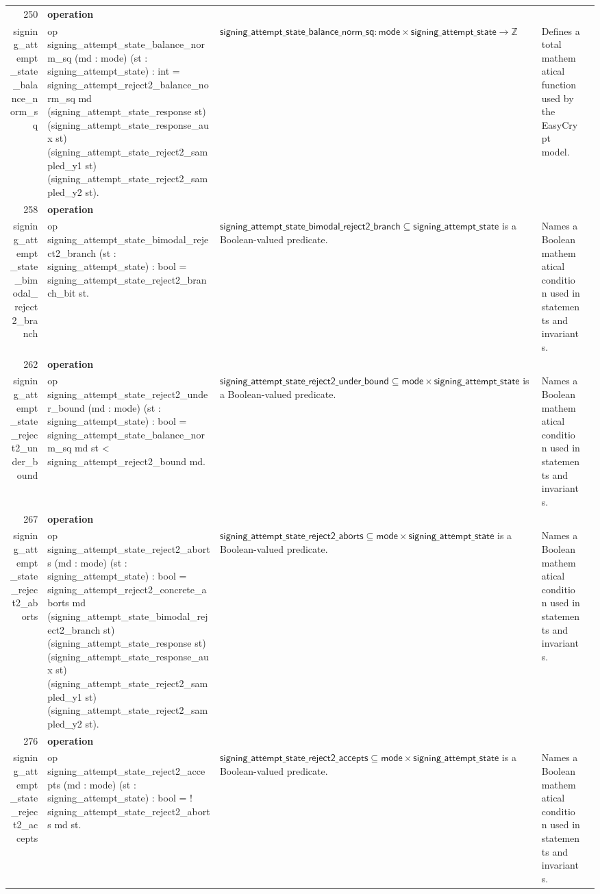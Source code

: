 \documentclass[10pt]{article}
\newcommand{\ec}[1]{\begingroup\ttfamily\scriptsize #1\endgroup}
\begin{document}
\begin{longtable}{r L{0.17\textwidth} L{0.26\textwidth} L{0.27\textwidth} L{0.20\textwidth}}
250 & \textbf{operation}\\\ec{signing\_attempt\_state\_balance\_norm\_sq} & \ec{op signing\_attempt\_state\_balance\_norm\_sq (md : mode) (st : signing\_attempt\_state) : int = signing\_attempt\_reject2\_balance\_norm\_sq md (signing\_attempt\_state\_response st) (signing\_attempt\_state\_response\_aux st) (signing\_attempt\_state\_reject2\_sampled\_y1 st) (signing\_attempt\_state\_reject2\_sampled\_y2 st).} & \(\mathsf{signing\_attempt\_state\_balance\_norm\_sq} : \mathsf{mode} \times \mathsf{signing\_attempt\_state} \to \mathbb{Z}\) & Defines a total mathematical function used by the EasyCrypt model. \\
258 & \textbf{operation}\\\ec{signing\_attempt\_state\_bimodal\_reject2\_branch} & \ec{op signing\_attempt\_state\_bimodal\_reject2\_branch (st : signing\_attempt\_state) : bool = signing\_attempt\_state\_reject2\_branch\_bit st.} & \(\mathsf{signing\_attempt\_state\_bimodal\_reject2\_branch} \subseteq \mathsf{signing\_attempt\_state}\) is a Boolean-valued predicate. & Names a Boolean mathematical condition used in statements and invariants. \\
262 & \textbf{operation}\\\ec{signing\_attempt\_state\_reject2\_under\_bound} & \ec{op signing\_attempt\_state\_reject2\_under\_bound (md : mode) (st : signing\_attempt\_state) : bool = signing\_attempt\_state\_balance\_norm\_sq md st < signing\_attempt\_reject2\_bound md.} & \(\mathsf{signing\_attempt\_state\_reject2\_under\_bound} \subseteq \mathsf{mode} \times \mathsf{signing\_attempt\_state}\) is a Boolean-valued predicate. & Names a Boolean mathematical condition used in statements and invariants. \\
267 & \textbf{operation}\\\ec{signing\_attempt\_state\_reject2\_aborts} & \ec{op signing\_attempt\_state\_reject2\_aborts (md : mode) (st : signing\_attempt\_state) : bool = signing\_attempt\_reject2\_concrete\_aborts md (signing\_attempt\_state\_bimodal\_reject2\_branch st) (signing\_attempt\_state\_response st) (signing\_attempt\_state\_response\_aux st) (signing\_attempt\_state\_reject2\_sampled\_y1 st) (signing\_attempt\_state\_reject2\_sampled\_y2 st).} & \(\mathsf{signing\_attempt\_state\_reject2\_aborts} \subseteq \mathsf{mode} \times \mathsf{signing\_attempt\_state}\) is a Boolean-valued predicate. & Names a Boolean mathematical condition used in statements and invariants. \\
276 & \textbf{operation}\\\ec{signing\_attempt\_state\_reject2\_accepts} & \ec{op signing\_attempt\_state\_reject2\_accepts (md : mode) (st : signing\_attempt\_state) : bool = ! signing\_attempt\_state\_reject2\_aborts md st.} & \(\mathsf{signing\_attempt\_state\_reject2\_accepts} \subseteq \mathsf{mode} \times \mathsf{signing\_attempt\_state}\) is a Boolean-valued predicate. & Names a Boolean mathematical condition used in statements and invariants. \\

\end{longtable}
\end{document}
